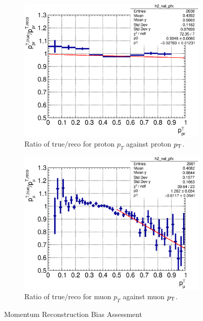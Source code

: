      \begin{figure}
     \centering
     \begin{subfigure}[b]{\dbfigwid\textwidth}
          \centering
          \includegraphics[width=\textwidth]{figures/sel/pr_pt_vs_pr_pt_bias_hist2d_al14.eps}
          \caption{Ratio of true$/$reco for proton $p_T$ against proton $p_\textrm{T}$.}
          \label{subfig:esc-prpt}
     \end{subfigure}
     \begin{subfigure}[b]{\dbfigwid\textwidth}
          \centering
          \includegraphics[width=\textwidth]{figures/sel/mu_pt_vs_mu_pt_bias_hist2d_al14.eps}
          \caption{Ratio of true$/$reco for muon $p_T$ against muon $p_\textrm{T}$.}
          \label{subfig:esc-mupt}
     \end{subfigure}
     \caption{Momentum Reconstruction Bias Assessment}
     \label{fig:esc-prmupt}
     \end{figure}


